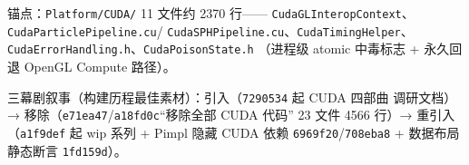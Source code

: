 锚点：\texttt{Platform/CUDA/} 11 文件约 2370 行——
\texttt{CudaGLInteropContext}、\texttt{CudaParticlePipeline.cu}/
\texttt{CudaSPHPipeline.cu}、\texttt{CudaTimingHelper}、
\texttt{CudaErrorHandling.h}、\texttt{CudaPoisonState.h}
（进程级 atomic 中毒标志 + 永久回退 OpenGL Compute 路径）。

三幕剧叙事（构建历程最佳素材）：引入（\texttt{7290534} 起 CUDA 四部曲
调研文档）→ 移除（\texttt{e71ea47}/\texttt{a18fd0c}``移除全部 CUDA 代码''
23 文件 4566 行）→ 重引入（\texttt{a1f9def} 起 wip 系列 + Pimpl 隐藏
CUDA 依赖 \texttt{6969f20}/\texttt{708eba8} + 数据布局静态断言
\texttt{1fd159d}）。

